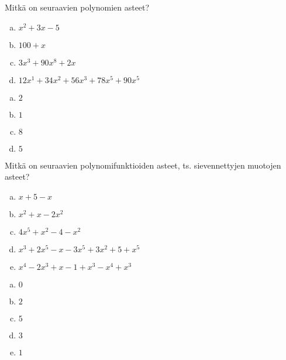 \begin{tehtava}
	Mitkä on seuraavien polynomien asteet?
	\begin{enumerate}[a)]
		\item $x^2 + 3x - 5$
		\item $100 + x$
		\item $3x^3 + 90x^8 + 2x$
		\item $12x^1 + 34x^2 + 56x^3 + 78x^5 + 90x^5$
	\end{enumerate}

	\begin{vastaus}
		\begin{enumerate}[a)]
			\item $2$
			\item $1$
			\item $8$
			\item $5$
		\end{enumerate}
	\end{vastaus}
\end{tehtava}

\begin{tehtava}
	Mitkä on seuraavien polynomifunktioiden asteet, ts. sievennettyjen muotojen asteet?
	\begin{enumerate}[a)]
		\item $x+5-x$
		\item $x^2+x-2x^2$
		\item $4x^5+x^2-4-x^2$
		\item $x^3+2x^5-x-3x^5+3x^2+5+x^5$
		\item $x^4-2x^3+x-1+x^3-x^4+x^3$
	\end{enumerate}

	\begin{vastaus}
		\begin{enumerate}[a)]
			\item $0$
			\item $2$
			\item $5$
			\item $3$
			\item $1$
		\end{enumerate}
	\end{vastaus}
\end{tehtava}

